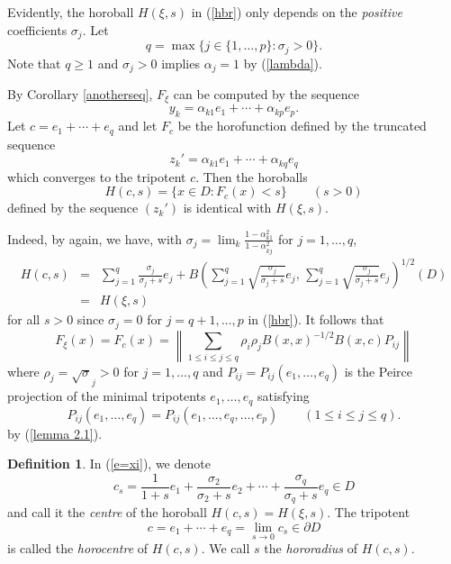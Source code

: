 \documentclass[12pt, twoside]{article}
\theoremstyle{definition}
\newtheorem{definition}[theorem]{Definition}
\numberwithin{equation}{section}
\begin{document}
Evidently, the horoball $H(\xi,s)$ in (\ref{hbr})
only depends on the {\it positive} coefficients $\sigma_j$.
Let
$$q= \max \{j\in \{1, \ldots, p\}: \sigma_j >0\}.$$
Note that $q \geq 1$ and $\sigma_j >0$ implies $\alpha_j =1$ by (\ref{lambda}).

By Corollary \ref{anotherseq}, $F_\xi$ can be computed by the sequence
$$y_k=\alpha_{k1} e_1 + \cdots + \alpha_{kp}e_p.$$
Let $c= e_1 + \cdots +e_q$ and
let $F_c$ be the horofunction
defined by the truncated sequence
\begin{equation}\label{trunc}
z_k'=\alpha_{k1} e_1 + \cdots + \alpha_{kq}e_q
\end{equation}
which converges to the tripotent $c$.
Then the horoballs
$$H(c, s)= \{x\in D: F_c(x)<s\} \qquad (s>0)$$
 defined by the sequence
$( z_k')$ is identical with $H(\xi,s)$.

Indeed, by  \cite[Theorem 5.11]{horo} again, we have,
with $\sigma_j = \lim_k \frac{1- \alpha_{k1}^2}{1-\alpha_{kj}^2}$ for $j=1, \ldots, q$,
 \begin{eqnarray}\label{e=xi}
H(c,s) &=&  \sum_{j=1}^q \frac{\sigma_j}{\sigma_j+s} e_j +
B\left (\sum_{j=1}^q \sqrt{\frac{\sigma_j}{\sigma_j+s}} e_j, \,\sum_{j=1}^q \sqrt{\frac{\sigma_j}{\sigma_j +s}} e_j
\right)^{1/2}(D)\nonumber\\
&=& H(\xi,s)
\end{eqnarray}
 for all $s>0$  since $\sigma_j =0$ for $j= q+1, \ldots, p$ in (\ref{hbr}). It follows that
\begin{equation}\label{>0}
 F_\xi (x) =F_c (x)  = \left\|\sum_{1\leq i\leq j\leq q}\rho_i\rho_jB(x,x)^{-1/2}B(x,c)P_{ij}\right\|
\end{equation}
where  $\rho_j = \sqrt\sigma_j>0$ for $j=1, \ldots,q$ and
$P_{ij} = P_{ij}(e_1, \ldots, e_q)$ is the Peirce projection of the minimal tripotents $e_1, \ldots, e_q$
satisfying
\begin{equation*}
P_{ij}(e_1, \ldots, e_q) = P_{ij}(e_1, \ldots, e_q, \ldots, e_p) \qquad (1\leq i\leq j\leq q).
\end{equation*}
by (\ref{lemma 2.1}).

\begin{definition}
In (\ref{e=xi}), we denote
\begin{equation}\label{center}
c_s =  \frac{1}{1+s} e_1 +  \frac{\sigma_2}{\sigma_2+ s} e_2 + \cdots +  \frac{\sigma_q}{\sigma_q+s} e_q
\in D
\end{equation}
and call it the {\it centre} of the horoball $H(c,s)=H(\xi,s)$. The tripotent
$$c=e_1 + \cdots + e_q = \lim_{s\rightarrow 0} c_s \in \partial D$$ is called
the {\it horocentre} of $H(c,s)$. We call $s$ the {\it hororadius} of $H(c,s)$.
\end{definition}
\end{document}
